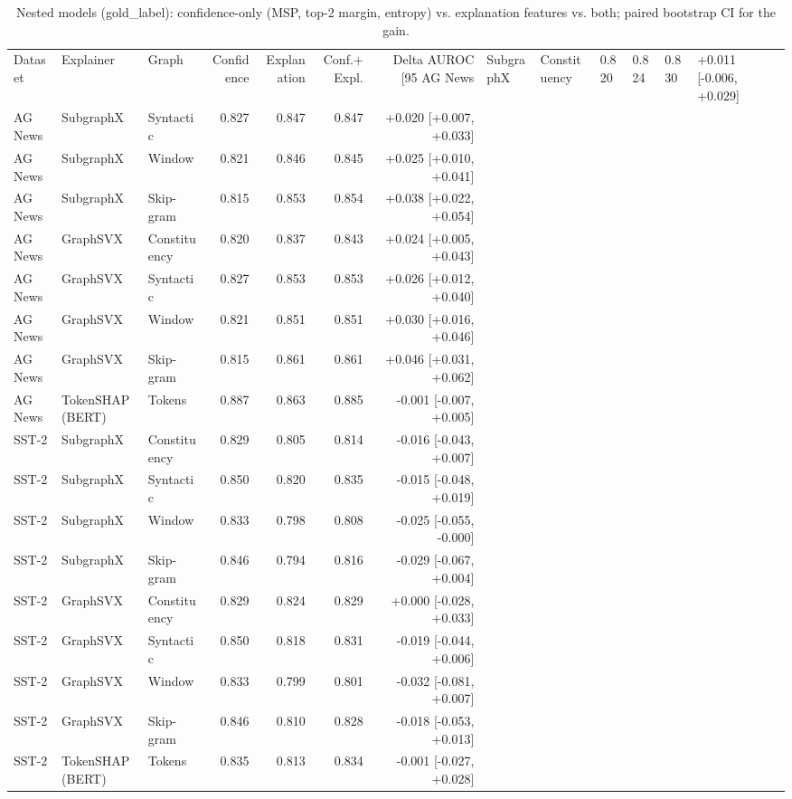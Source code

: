 \begin{table}[H]
\centering
\small
\caption{Nested models (gold_label): confidence-only (MSP, top-2 margin, entropy) vs. explanation features vs. both; paired bootstrap CI for the gain.}
\label{tab:nested_gold_label}
\begin{tabular}{lllrrrr}
\toprule
Dataset & Explainer & Graph & Confidence & Explanation & Conf.+Expl. & Delta AUROC [95%
\midrule
AG News & SubgraphX & Constituency & 0.820 & 0.824 & 0.830 & +0.011 [-0.006, +0.029] \\
AG News & SubgraphX & Syntactic & 0.827 & 0.847 & 0.847 & +0.020 [+0.007, +0.033] \\
AG News & SubgraphX & Window & 0.821 & 0.846 & 0.845 & +0.025 [+0.010, +0.041] \\
AG News & SubgraphX & Skip-gram & 0.815 & 0.853 & 0.854 & +0.038 [+0.022, +0.054] \\
AG News & GraphSVX & Constituency & 0.820 & 0.837 & 0.843 & +0.024 [+0.005, +0.043] \\
AG News & GraphSVX & Syntactic & 0.827 & 0.853 & 0.853 & +0.026 [+0.012, +0.040] \\
AG News & GraphSVX & Window & 0.821 & 0.851 & 0.851 & +0.030 [+0.016, +0.046] \\
AG News & GraphSVX & Skip-gram & 0.815 & 0.861 & 0.861 & +0.046 [+0.031, +0.062] \\
AG News & TokenSHAP (BERT) & Tokens & 0.887 & 0.863 & 0.885 & -0.001 [-0.007, +0.005] \\
SST-2 & SubgraphX & Constituency & 0.829 & 0.805 & 0.814 & -0.016 [-0.043, +0.007] \\
SST-2 & SubgraphX & Syntactic & 0.850 & 0.820 & 0.835 & -0.015 [-0.048, +0.019] \\
SST-2 & SubgraphX & Window & 0.833 & 0.798 & 0.808 & -0.025 [-0.055, -0.000] \\
SST-2 & SubgraphX & Skip-gram & 0.846 & 0.794 & 0.816 & -0.029 [-0.067, +0.004] \\
SST-2 & GraphSVX & Constituency & 0.829 & 0.824 & 0.829 & +0.000 [-0.028, +0.033] \\
SST-2 & GraphSVX & Syntactic & 0.850 & 0.818 & 0.831 & -0.019 [-0.044, +0.006] \\
SST-2 & GraphSVX & Window & 0.833 & 0.799 & 0.801 & -0.032 [-0.081, +0.007] \\
SST-2 & GraphSVX & Skip-gram & 0.846 & 0.810 & 0.828 & -0.018 [-0.053, +0.013] \\
SST-2 & TokenSHAP (BERT) & Tokens & 0.835 & 0.813 & 0.834 & -0.001 [-0.027, +0.028] \\
\bottomrule
\end{tabular}
\end{table}

